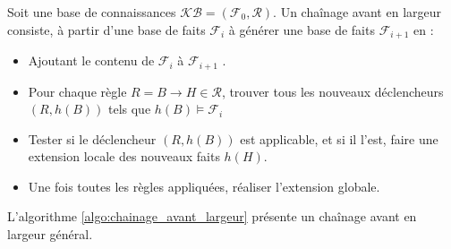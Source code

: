 \begin{definition}
Soit une base de connaissances $\mathcal{KB} = (\mathcal{F}_0, \mathcal{R})$. Un chaînage avant en largeur consiste, à partir d'une base de faits $\mathcal{F}_i$ à générer une base de faits $\mathcal{F}_{i+1}$ en :
\begin{itemize}
    \item Ajoutant le contenu de $\mathcal{F}_{i}$ à $\mathcal{F}_{i+1}$ .
    \item Pour chaque règle $R = B \rightarrow H \in \mathcal{R}$, trouver tous les nouveaux déclencheurs $(R,h(B))$ tels que $h(B) \vDash \mathcal{F}_i$ 
    \item Tester si le déclencheur $(R,h(B))$ est applicable, et si il l'est, faire une extension locale des nouveaux faits $h(H)$.
    \item Une fois toutes les règles appliquées, réaliser l'extension globale.
\end{itemize}
\end{definition}

\par
L'algorithme \ref{algo:chainage_avant_largeur} présente un chaînage avant en largeur général.


